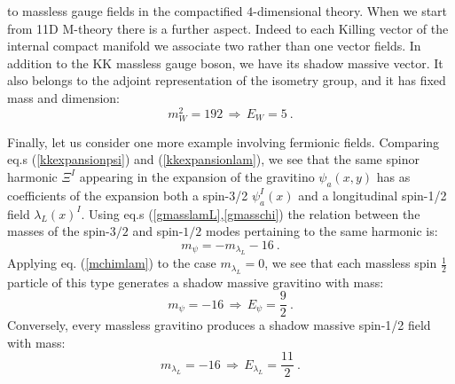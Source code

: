 \documentclass[a4paper,11pt]{article}
\newcommand{\ft}[2]{{\textstyle\frac{#1}{#2}}}
\begin{document}
to massless gauge fields in the compactified $4$-dimensional
theory. When we start from 11D M-theory there is a further aspect.
Indeed to each Killing vector of the internal compact manifold we
associate two rather than one vector fields. In addition to the KK
massless gauge boson, we have its shadow massive vector. It also
belongs to the adjoint representation of the isometry group, and
it has fixed mass and dimension:
\begin{equation}
  m^2_W = 192 \, \Rightarrow \, E_W =5~.
\label{emme2w}
\end{equation}
\par
Finally, let us consider one more example involving fermionic
fields. Comparing eq.s (\ref{kkexpansionpsi}) and
(\ref{kkexpansionlam}), we see that the same spinor harmonic
$\Xi^I$ appearing in the expansion of the gravitino $\psi_a(x,y)$
has as coefficients of the expansion both a spin-3/2 $\psi^I_a(x)$
and a longitudinal spin-1/2 field $\lambda_L(x)^I$. Using eq.s
(\ref{gmasslamL},\ref{gmasschi}) the relation between the masses
of the spin-$3/2$  and spin-$1/2$ modes pertaining to the same
harmonic is:
\begin{equation}
  m_\psi=-m_{\lambda_L} -16~.
\label{mchimlam}
\end{equation}
Applying eq. (\ref{mchimlam}) to the case $m_{\lambda_L}=0$, we
see that each massless spin $\ft 12$ particle of this type
generates a shadow massive gravitino with mass:
\begin{equation}
  m_\psi = -16 \, \Rightarrow \, E_\psi= \frac 9 2 ~.
\label{mchi92}
\end{equation}
Conversely, every massless gravitino produces a shadow massive
spin-1/2 field with mass:
\begin{equation}
  m_{\lambda _L} = -16 \, \Rightarrow \, E_{\lambda _L}= \frac {11}2~.
\label{mlam112}
\end{equation}
%
\end{document}
